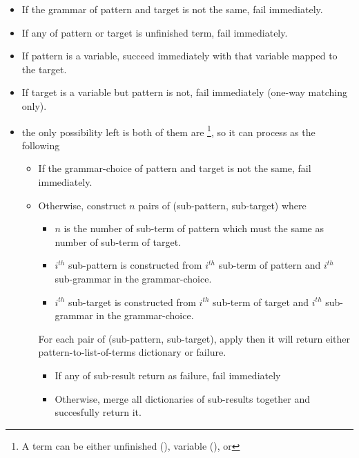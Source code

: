 \documentclass[master.tex]{subfiles}
\begin{document}
\begin{itemize}
\item If the grammar of pattern and target is not the same, fail immediately.
\item If any of pattern or target is unfinished term, fail immediately.
\item If pattern is a variable, succeed immediately with that variable
  mapped to the target.
\item If target is a variable but pattern is not, fail immediately (one-way
  matching only).
\item the only possibility left is both of them are
  \footnote{A term can be either unfinished (),
    variable (), or
    }, so it can process as the following
  \begin{itemize}
  \item If the grammar-choice of pattern and target is not the same, fail
    immediately.
  \item Otherwise, construct $n$ pairs of (sub-pattern, sub-target) where
    \begin{itemize}
    \item $n$ is the number of sub-term of pattern which must the same as number of sub-term of target.
    \item $i^{th}$ sub-pattern is constructed from $i^{th}$ sub-term of pattern
      and $i^{th}$ sub-grammar in the grammar-choice.
    \item $i^{th}$ sub-target is constructed from $i^{th}$ sub-term of target
      and $i^{th}$ sub-grammar in the grammar-choice.
    \end{itemize}

    For each pair of (sub-pattern, sub-target), apply
     then it will return either
    pattern-to-list-of-terms dictionary or failure.

    \begin{itemize}
    \item If any of sub-result return as failure, fail immediately
    \item Otherwise, merge all dictionaries of sub-results together and
      succesfully return it.
    \end{itemize}

  \end{itemize}
\end{itemize}
\end{document}
